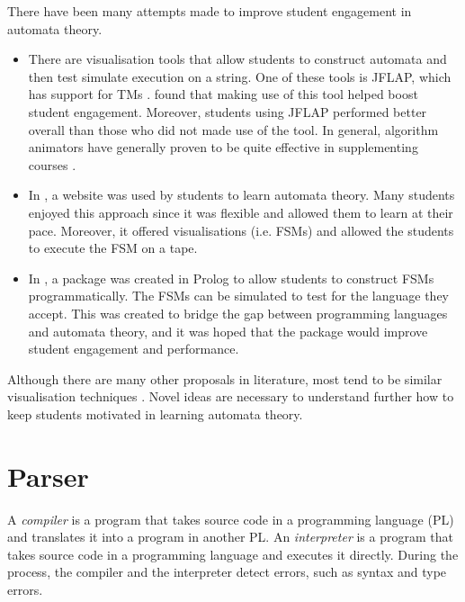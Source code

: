 There have been many attempts made to improve student engagement in automata theory. 
\begin{itemize}
    \item There are visualisation tools that allow students to construct automata and then test simulate execution on a string. One of these tools is JFLAP, which has support for TMs \citep{rodger2006jflap}. \citet{rodger2009increasing} found that making use of this tool helped boost student engagement. Moreover, students using JFLAP performed better overall than those who did not made use of the tool. In general, algorithm animators have generally proven to be quite effective in supplementing courses \citep{stasko1998empirically}.
    
    \item In \citet{tecson2018tutoring}, a website was used by students to learn automata theory. Many students enjoyed this approach since it was flexible and allowed them to learn at their pace. Moreover, it offered visualisations (i.e. FSMs) and allowed the students to execute the FSM on a tape.
    
    \item In \citet{wermelinger2005prolog}, a package was created in Prolog to allow students to construct FSMs programmatically. The FSMs can be simulated to test for the language they accept. This was created to bridge the gap between programming languages and automata theory, and it was hoped that the package would improve student engagement and performance.
\end{itemize} 

Although there are many other proposals in literature, most tend to be similar visualisation techniques \citep{zingaro2008another}. Novel ideas are necessary to understand further how to keep students motivated in learning automata theory. 

\section{Parser}
A \emph{compiler} is a program that takes source code in a programming language (PL) and translates it into a program in another PL. An \emph{interpreter} is a program that takes source code in a programming language and executes it directly. During the process, the compiler and the interpreter detect errors, such as syntax and type errors.

